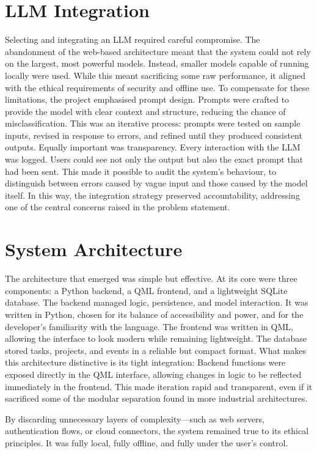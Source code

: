 \documentclass{report}
\begin{document}
\section{LLM Integration}

Selecting and integrating an LLM required careful compromise. 
The abandonment of the web-based architecture meant that the system could not rely on the largest, most powerful models. 
Instead, smaller models capable of running locally were used. 
While this meant sacrificing some raw performance, it aligned with the ethical requirements of security and offline use.
To compensate for these limitations, the project emphasised prompt design. 
Prompts were crafted to provide the model with clear context and structure, reducing the chance of misclassification. 
This was an iterative process: prompts were tested on sample inputs, revised in response to errors, and refined until they produced consistent outputs.
Equally important was transparency. Every interaction with the LLM was logged. Users could see not only the output but also the exact prompt that had been sent. 
This made it possible to audit the system's behaviour, to distinguish between errors caused by vague input and those caused by the model itself. 
In this way, the integration strategy preserved accountability, addressing one of the central concerns raised in the problem statement.

\section{System Architecture}

The architecture that emerged was simple but effective. 
At its core were three components: a Python backend, a QML frontend, and a lightweight SQLite database.
The backend managed logic, persistence, and model interaction. 
It was written in Python, chosen for its balance of accessibility and power, and for the developer's familiarity with the language. 
The frontend was written in QML, allowing the interface to look modern while remaining lightweight. 
The database stored tasks, projects, and events in a reliable but compact format.
What makes this architecture distinctive is its tight integration: Backend functions were exposed directly in the QML interface, allowing changes in logic to be reflected immediately in the frontend. 
This made iteration rapid and transparent, even if it sacrificed some of the modular separation found in more industrial architectures.

By discarding unnecessary layers of complexity—such as web servers, authentication flows, or cloud connectors, the system remained true to its ethical principles. 
It was fully local, fully offline, and fully under the user's control.
\end{document}
